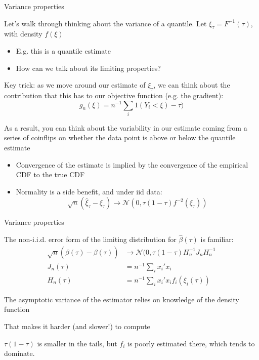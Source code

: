 \documentclass[notes,11pt, aspectratio=169]{beamer}
\newenvironment{wideitemize}{\itemize\addtolength{\itemsep}{10pt}}{\enditemize}
\begin{document}
\begin{frame}{Variance properties}
  \begin{wideitemize}
  \item Let's walk through thinking about the variance of a quantile. Let $\xi_{\tau} = F^{-1}(\tau)$, with density $f(\xi)$
    \begin{itemize}
    \item E.g. this is a quantile estimate
    \item How can we talk about its limiting properties?
    \end{itemize}
  \item Key trick: as we move around our estimate of $\xi_{\tau}$, we can think about the contribution that this has to our objective function (e.g. the gradient):
    $$g_{n}(\xi) = n^{-1}\sum_{i}1(Y_{i} < \xi) - \tau)$$
  \item As a result, you can think about the variability in our
    estimate coming from a series of coinflips on whether the data
    point is above or below the quantile estimate
    \begin{itemize}
    \item Convergence of the estimate is implied by the convergence
      of the empirical CDF to the true CDF
    \item Normality is a side benefit, and under iid data:
      $$ \sqrt{n}(\hat{\xi}_{\tau} - \xi_{\tau}) \rightarrow \mathcal{N}(0, \tau(1-\tau)f^{-2}(\xi_{\tau}))$$
    \end{itemize}
  \end{wideitemize}
\end{frame}


\begin{frame}{Variance properties}
  \begin{wideitemize}
  \item The non-i.i.d. error form of the limiting distribution for $\hat{\beta}(\tau)$ is familiar:
    \begin{align*}
    \sqrt{n}(\hat{\beta}(\tau) - \beta(\tau)) &\rightarrow \mathcal{N}(0, \tau(1-\tau)H^{-1}_{n}J_{n}H_{n}^{-1}\\
    J_{n}(\tau) &= n^{-1}\sum_{i}x_{i}'x_{i}\\
    H_{n}(\tau) &= n^{-1}\sum_{i}x_{i}'x_{i}f_{i}(\xi_{i}(\tau))
    \end{align*}
  \item The asymptotic variance of the estimator relies on knowledge of the density function
  \item That makes it harder (and slower!) to compute
  \item $\tau(1-\tau)$ is smaller in the tails, but $f_{i}$ is poorly
    estimated there, which tends to dominate.
  \end{wideitemize}
\end{frame}
\end{document}
